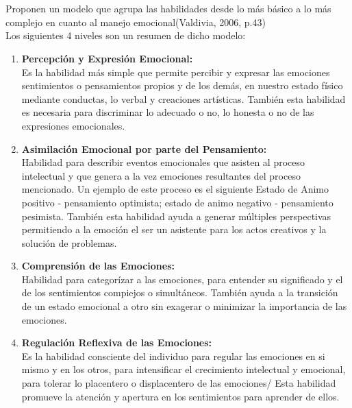\\\\Proponen un modelo que agrupa las habilidades desde lo más básico a lo más complejo en cuanto al manejo emocional(Valdivia, 2006, p.43)\\
Los siguientes 4 niveles son un resumen de dicho modelo:
\begin{enumerate}[label=\itembolasazules{\arabic*}]
\item \textbf{Percepción y Expresión Emocional:}\\
 Es la habilidad más simple que permite percibir y expresar las emociones sentimientos o pensamientos propios y de los demás, en nuestro estado físico mediante conductas, lo verbal y creaciones artísticas. También esta habilidad es necesaria para discriminar lo adecuado o no, lo honesta o no de las expresiones emocionales.
\item \textbf{Asimilación Emocional por parte del Pensamiento:}\\
 Habilidad para
describir eventos emocionales que asisten al proceso intelectual y que genera a la vez emociones resultantes del proceso mencionado. Un ejemplo de este proceso es el siguiente Estado de Animo positivo - pensamiento optimista; estado de animo negativo - pensamiento pesimista. También esta habilidad ayuda a generar múltiples perspectivas permitiendo a la emoción el ser un asistente para los actos creativos y la solución de problemas.
\item \textbf{Comprensión de las Emociones:}\\
 Habilidad para categorízar a las
emociones, para entender su significado y el de los sentimientos compiejos o simultáneos. También ayuda a la transición de un estado emocional a otro sin exagerar o minimizar la importancia de las emociones.
\item \textbf{Regulación Reflexiva de las Emociones:}\\
 Es la habilidad consciente del individuo para regular las emociones en si mismo y en los otros, para intensificar el crecimiento intelectual y emocional, para tolerar lo placentero o displacentero de las emociones/ Esta habilidad promueve la atención y apertura en los sentimientos para aprender de ellos.
\end{enumerate}








